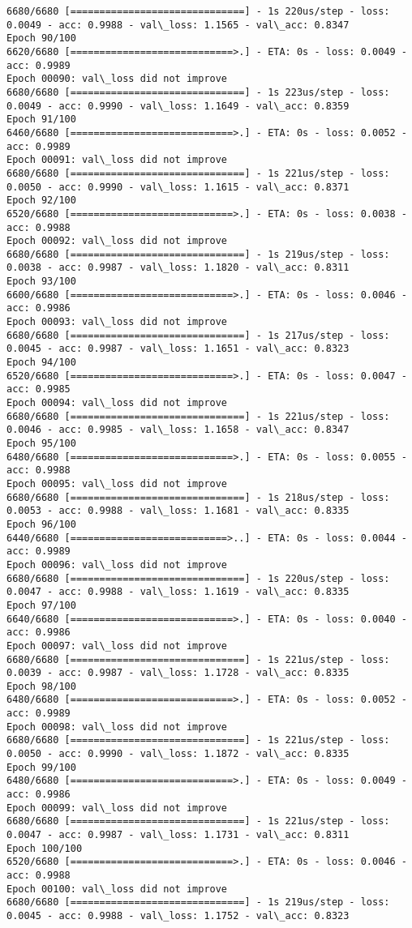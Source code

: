 \documentclass[11pt]{article}
\begin{document}
\begin{Verbatim}[commandchars=\\\{\}]
6680/6680 [==============================] - 1s 220us/step - loss: 0.0049 - acc: 0.9988 - val\_loss: 1.1565 - val\_acc: 0.8347
Epoch 90/100
6620/6680 [============================>.] - ETA: 0s - loss: 0.0049 - acc: 0.9989
Epoch 00090: val\_loss did not improve
6680/6680 [==============================] - 1s 223us/step - loss: 0.0049 - acc: 0.9990 - val\_loss: 1.1649 - val\_acc: 0.8359
Epoch 91/100
6460/6680 [============================>.] - ETA: 0s - loss: 0.0052 - acc: 0.9989
Epoch 00091: val\_loss did not improve
6680/6680 [==============================] - 1s 221us/step - loss: 0.0050 - acc: 0.9990 - val\_loss: 1.1615 - val\_acc: 0.8371
Epoch 92/100
6520/6680 [============================>.] - ETA: 0s - loss: 0.0038 - acc: 0.9988
Epoch 00092: val\_loss did not improve
6680/6680 [==============================] - 1s 219us/step - loss: 0.0038 - acc: 0.9987 - val\_loss: 1.1820 - val\_acc: 0.8311
Epoch 93/100
6600/6680 [============================>.] - ETA: 0s - loss: 0.0046 - acc: 0.9986
Epoch 00093: val\_loss did not improve
6680/6680 [==============================] - 1s 217us/step - loss: 0.0045 - acc: 0.9987 - val\_loss: 1.1651 - val\_acc: 0.8323
Epoch 94/100
6520/6680 [============================>.] - ETA: 0s - loss: 0.0047 - acc: 0.9985
Epoch 00094: val\_loss did not improve
6680/6680 [==============================] - 1s 221us/step - loss: 0.0046 - acc: 0.9985 - val\_loss: 1.1658 - val\_acc: 0.8347
Epoch 95/100
6480/6680 [============================>.] - ETA: 0s - loss: 0.0055 - acc: 0.9988
Epoch 00095: val\_loss did not improve
6680/6680 [==============================] - 1s 218us/step - loss: 0.0053 - acc: 0.9988 - val\_loss: 1.1681 - val\_acc: 0.8335
Epoch 96/100
6440/6680 [===========================>..] - ETA: 0s - loss: 0.0044 - acc: 0.9989
Epoch 00096: val\_loss did not improve
6680/6680 [==============================] - 1s 220us/step - loss: 0.0047 - acc: 0.9988 - val\_loss: 1.1619 - val\_acc: 0.8335
Epoch 97/100
6640/6680 [============================>.] - ETA: 0s - loss: 0.0040 - acc: 0.9986
Epoch 00097: val\_loss did not improve
6680/6680 [==============================] - 1s 221us/step - loss: 0.0039 - acc: 0.9987 - val\_loss: 1.1728 - val\_acc: 0.8335
Epoch 98/100
6480/6680 [============================>.] - ETA: 0s - loss: 0.0052 - acc: 0.9989
Epoch 00098: val\_loss did not improve
6680/6680 [==============================] - 1s 221us/step - loss: 0.0050 - acc: 0.9990 - val\_loss: 1.1872 - val\_acc: 0.8335
Epoch 99/100
6480/6680 [============================>.] - ETA: 0s - loss: 0.0049 - acc: 0.9986
Epoch 00099: val\_loss did not improve
6680/6680 [==============================] - 1s 221us/step - loss: 0.0047 - acc: 0.9987 - val\_loss: 1.1731 - val\_acc: 0.8311
Epoch 100/100
6520/6680 [============================>.] - ETA: 0s - loss: 0.0046 - acc: 0.9988
Epoch 00100: val\_loss did not improve
6680/6680 [==============================] - 1s 219us/step - loss: 0.0045 - acc: 0.9988 - val\_loss: 1.1752 - val\_acc: 0.8323

    \end{Verbatim}
\end{document}
